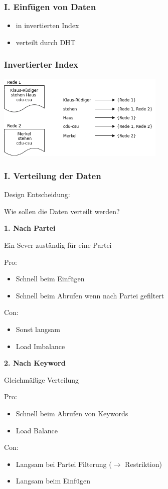 \documentclass{beamer}
\begin{document}
\begin{frame}
  \frametitle{I. Einfügen von Daten}

  \begin{itemize}
    \item in invertierten Index
    \item verteilt durch DHT
  \end{itemize}
\end{frame}

\begin{frame}
  \frametitle{Invertierter Index}

  \includegraphics[width=8cm]{inverted-index}
\end{frame}

\begin{frame}[allowframebreaks]
  \frametitle{I. Verteilung der Daten}

  Design Entscheidung:

  Wie sollen die Daten verteilt werden?

  \break

  \textbf{1. Nach Partei}

  Ein Sever zuständig für eine Partei

  Pro:
  \begin{itemize}
    \item Schnell beim Einfügen
    \item Schnell beim Abrufen wenn nach Partei gefiltert
  \end{itemize}
  Con:
  \begin{itemize}
    \item Sonst langsam
    \item Load Imbalance
  \end{itemize}

  \break

  \textbf{2. Nach Keyword}

  Gleichmäßige Verteilung

  Pro:
  \begin{itemize}
    \item Schnell beim Abrufen von Keywords
    \item Load Balance
  \end{itemize}

  Con:
  \begin{itemize}
    \item Langsam bei Partei Filterung ($\rightarrow$ Restriktion)
    \item Langsam beim Einfügen
  \end{itemize}
\end{frame}
\end{document}
